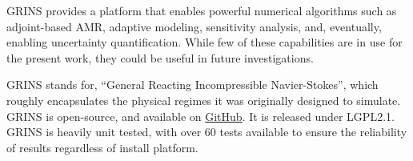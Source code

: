 GRINS provides a platform that enables powerful numerical algorithms
such as adjoint-based AMR, adaptive modeling, sensitivity analysis,
and, eventually, enabling uncertainty quantification. While few of these
capabilities are in use for the present work, they could be useful in
future investigations. 

GRINS stands for, ``General Reacting Incompressible Navier-Stokes'',
which roughly encapsulates the physical regimes it was originally
designed to simulate. GRINS is open-source, and available on
\hyperref[www.github.com/grinsfem/grins]{GitHub}. It is released 
under LGPL2.1.  GRINS is heavily unit tested, with over 60 tests
available to ensure the reliability of results regardless of install
platform. 






%
%




